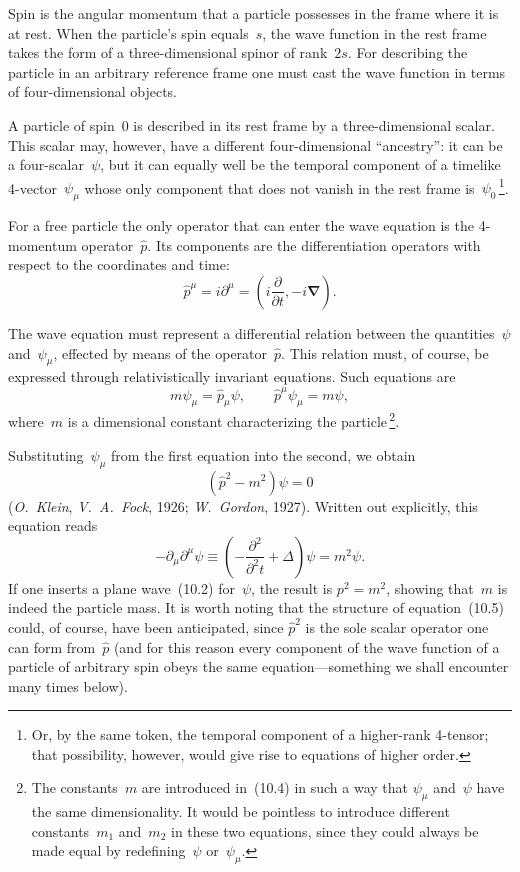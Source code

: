 Spin is the angular momentum that a particle possesses in the frame where it is at rest. When the particle's spin equals~$s$, the wave function in the rest frame takes the form of a three-dimensional spinor of rank~$2s$. For describing the particle in an arbitrary reference frame one must cast the wave function in terms of four-dimensional objects.

A particle of spin~0 is described in its rest frame by a three-dimensional scalar. This scalar may, however, have a different four-dimensional ``ancestry'': it can be a four-scalar~$\psi$, but it can equally well be the temporal component of a timelike 4-vector~$\psi_\mu$ whose only component that does not vanish in the rest frame is~$\psi_0$\,\footnote{Or, by the same token, the temporal component of a higher-rank 4-tensor; that possibility, however, would give rise to equations of higher order.}.

For a free particle the only operator that can enter the wave equation is the 4-momentum operator~$\hat{p}$. Its components are the differentiation operators with respect to the coordinates and time:
\begin{equation}
\hat{p}^\mu = i\partial^\mu = \left(i\frac{\partial}{\partial t}, -i\boldsymbol{\nabla}\right).
\tag{10.3}
\end{equation}

The wave equation must represent a differential relation between the quantities~$\psi$ and~$\psi_\mu$, effected by means of the operator~$\hat{p}$. This relation must, of course, be expressed through relativistically invariant equations. Such equations are
\begin{equation}
m\psi_\mu = \hat{p}_\mu\psi, \qquad \hat{p}^\mu\psi_\mu = m\psi,
\tag{10.4}
\end{equation}
where~$m$ is a dimensional constant characterizing the particle\,\footnote{The constants~$m$ are introduced in~(10.4) in such a way that $\psi_\mu$ and~$\psi$ have the same dimensionality. It would be pointless to introduce different constants~$m_1$ and~$m_2$ in these two equations, since they could always be made equal by redefining~$\psi$ or~$\psi_\mu$.}.

Substituting~$\psi_\mu$ from the first equation into the second, we obtain
\begin{equation}
(\hat{p}^2 - m^2)\psi = 0
\tag{10.5}
\end{equation}
(\emph{O.~Klein}, \emph{V.~A.~Fock}, 1926; \emph{W.~Gordon}, 1927). Written out explicitly, this equation reads
\begin{equation}
-\partial_\mu\partial^\mu\psi \equiv \left(-\frac{\partial^2}{\partial^2 t} + \Delta\right)\psi = m^2\psi.
\tag{10.6}
\end{equation}
If one inserts a plane wave~(10.2) for~$\psi$, the result is $p^2 = m^2$, showing that~$m$ is indeed the particle mass. It is worth noting that the structure of equation~(10.5) could, of course, have been anticipated, since $\hat{p}^2$ is the sole scalar operator one can form from~$\hat{p}$ (and for this reason every component of the wave function of a particle of arbitrary spin obeys
the same equation---something we shall encounter many times below).

